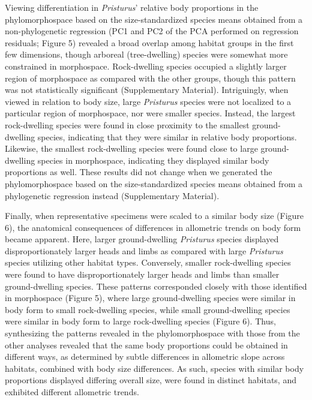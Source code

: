 \documentclass[
  11pt,
]{article}
\begin{document}
Viewing differentiation in \emph{Pristurus}' relative body proportions
in the phylomorphospace based on the size-standardized species means
obtained from a non-phylogenetic regression (PC1 and PC2 of the PCA
performed on regression residuals; Figure 5) revealed a broad overlap
among habitat groups in the first few dimensions, though arboreal
(tree-dwelling) species were somewhat more constrained in morphospace.
Rock-dwelling species occupied a slightly larger region of morphospace
as compared with the other groups, though this pattern was not
statistically significant (Supplementary Material). Intriguingly, when
viewed in relation to body size, large \emph{Pristurus} species were not
localized to a particular region of morphospace, nor were smaller
species. Instead, the largest rock-dwelling species were found in close
proximity to the smallest ground-dwelling species, indicating that they
were similar in relative body proportions. Likewise, the smallest
rock-dwelling species were found close to large ground-dwelling species
in morphospace, indicating they displayed similar body proportions as
well. These results did not change when we generated the
phylomorphospace based on the size-standardized species means obtained
from a phylogenetic regression instead (Supplementary Material).
\hfill\break

Finally, when representative specimens were scaled to a similar body
size (Figure 6), the anatomical consequences of differences in
allometric trends on body form became apparent. Here, larger
ground-dwelling \emph{Pristurus} species displayed disproportionately
larger heads and limbs as compared with large \emph{Pristurus} species
utilizing other habitat types. Conversely, smaller rock-dwelling species
were found to have disproportionately larger heads and limbs than
smaller ground-dwelling species. These patterns corresponded closely
with those identified in morphospace (Figure 5), where large
ground-dwelling species were similar in body form to small rock-dwelling
species, while small ground-dwelling species were similar in body form
to large rock-dwelling species (Figure 6). Thus, synthesizing the
patterns revealed in the phylomorphospace with those from the other
analyses revealed that the same body proportions could be obtained in
different ways, as determined by subtle differences in allometric slope
across habitats, combined with body size differences. As such, species
with similar body proportions displayed differing overall size, were
found in distinct habitats, and exhibited different allometric trends.
\hfill\break
\end{document}
